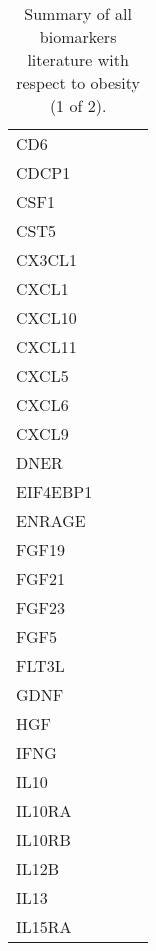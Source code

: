 \begin{table}[!htbp]
{\begin{tabular}{ lp{10cm} p{10cm} l }
        \multicolumn{1}{l|}{ CD6 } &    &    &           \\ 
        \multicolumn{1}{l|}{ CDCP1 } &    &    &           \\ 
        \multicolumn{1}{l|}{ CSF1 } &    &    &           \\ 
        \multicolumn{1}{l|}{ CST5 } &    &    &           \\ 
        \multicolumn{1}{l|}{ CX3CL1 } &    &    &           \\ 
        \multicolumn{1}{l|}{ CXCL1 } &    &    &           \\ 
        \multicolumn{1}{l|}{ CXCL10 } &    &    &           \\ 
        \multicolumn{1}{l|}{ CXCL11 } &    &    &           \\ 
        \multicolumn{1}{l|}{ CXCL5 } &    &    &           \\ 
        \multicolumn{1}{l|}{ CXCL6 } &    &    &           \\ 
        \multicolumn{1}{l|}{ CXCL9 } &    &    &           \\ 
        \multicolumn{1}{l|}{ DNER } &    &    &           \\ 
        \multicolumn{1}{l|}{ EIF4EBP1 } &    &    &           \\ 
        \multicolumn{1}{l|}{ ENRAGE } &    &    &           \\ 
        \multicolumn{1}{l|}{ FGF19 } &    &    &           \\ 
        \multicolumn{1}{l|}{ FGF21 } &    &    &           \\ 
        \multicolumn{1}{l|}{ FGF23 } &    &    &           \\ 
        \multicolumn{1}{l|}{ FGF5 } &    &    &           \\ 
        \multicolumn{1}{l|}{ FLT3L } &    &    &           \\ 
        \multicolumn{1}{l|}{ GDNF } &    &    &           \\ 
        \multicolumn{1}{l|}{ HGF } &    &    &           \\ 
        \multicolumn{1}{l|}{ IFNG } &    &    &           \\ 
        \multicolumn{1}{l|}{ IL10 } &    &    &           \\ 
        \multicolumn{1}{l|}{ IL10RA } &    &    &           \\ 
        \multicolumn{1}{l|}{ IL10RB } &    &    &           \\ 
        \multicolumn{1}{l|}{ IL12B } &    &    &           \\ 
        \multicolumn{1}{l|}{ IL13 } &    &    &           \\ 
        \multicolumn{1}{l|}{ IL15RA } &    &    &           \\ 

    \end{tabular}
 } 
 
    \caption{Summary of all biomarkers literature with respect to obesity (1 of 2).}
    \label{table:biomarkersReferences1of2DF}

\end{table}

